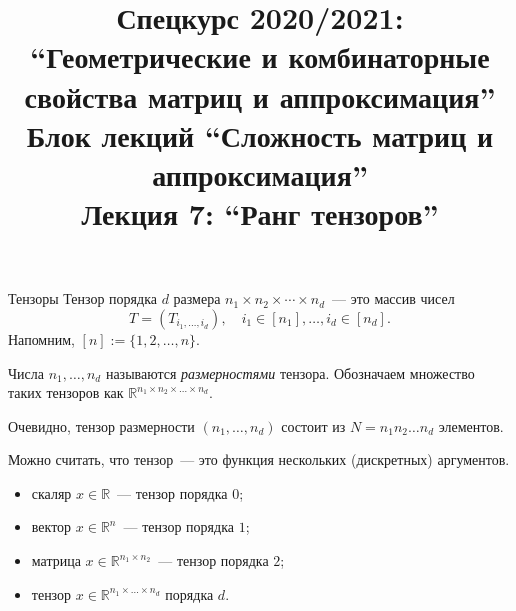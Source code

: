 \documentclass[handout]{beamer}
\title{Спецкурс 2020/2021: ``Геометрические и комбинаторные свойства матриц и
аппроксимация'' \\ Блок лекций ``Сложность матриц и аппроксимация'' \\ Лекция 7:
``Ранг тензоров''}
\newcommand\R{\mathbb R}
\begin{document}
\maketitle

\begin{frame}{Тензоры}
    Тензор порядка $d$ размера $n_1\times n_2\times\cdots\times n_d$~--- это массив
    чисел
    $$
    T = (T_{i_1,\ldots,i_d}),\quad i_1\in[n_1],\ldots,i_d\in[n_d].
    $$
    Напомним, $[n]:=\{1,2,\ldots,n\}$.
    \pause\vspace{5pt}

    Числа $n_1,\ldots,n_d$ называются \textit{размерностями} тензора. 
    Обозначаем множество таких тензоров как $\R^{n_1\times
    n_2\times\ldots \times n_d}$.
    \pause

    Очевидно, тензор размерности $(n_1,\ldots,n_d)$ состоит из $N=n_1n_2\ldots
    n_d$ элементов. 
    \pause\vspace{5pt}

    Можно считать, что тензор~--- это функция нескольких (дискретных)
    аргументов.
    \pause\vspace{5pt}

    \begin{itemize}
        \item скаляр $x\in\R$~--- тензор порядка $0$;\pause
        \item вектор $x\in\R^n$~--- тензор порядка $1$;\pause
        \item матрица $x\in\R^{n_1\times n_2}$~--- тензор порядка $2$;\pause
        \item тензор $x\in\R^{n_1\times\ldots\times n_d}$ порядка $d$.
    \end{itemize}

\end{frame}
\end{document}
